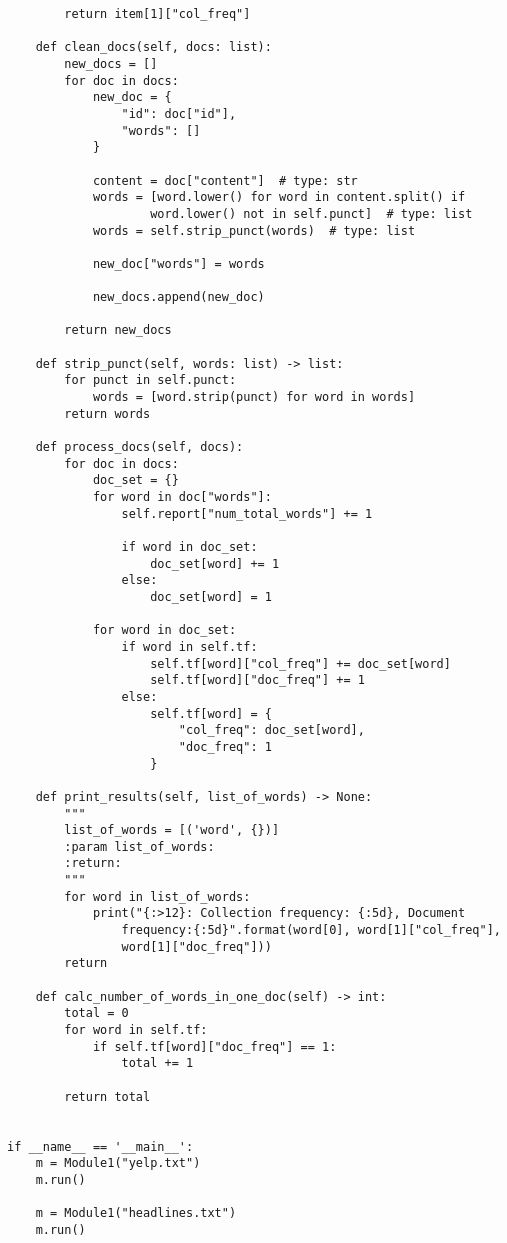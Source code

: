 \documentclass{article}
\begin{document}
\begin{verbatim}
        return item[1]["col_freq"]

    def clean_docs(self, docs: list):
        new_docs = []
        for doc in docs:
            new_doc = {
                "id": doc["id"],
                "words": []
            }

            content = doc["content"]  # type: str
            words = [word.lower() for word in content.split() if
                    word.lower() not in self.punct]  # type: list
            words = self.strip_punct(words)  # type: list

            new_doc["words"] = words

            new_docs.append(new_doc)

        return new_docs

    def strip_punct(self, words: list) -> list:
        for punct in self.punct:
            words = [word.strip(punct) for word in words]
        return words

    def process_docs(self, docs):
        for doc in docs:
            doc_set = {}
            for word in doc["words"]:
                self.report["num_total_words"] += 1

                if word in doc_set:
                    doc_set[word] += 1
                else:
                    doc_set[word] = 1

            for word in doc_set:
                if word in self.tf:
                    self.tf[word]["col_freq"] += doc_set[word]
                    self.tf[word]["doc_freq"] += 1
                else:
                    self.tf[word] = {
                        "col_freq": doc_set[word],
                        "doc_freq": 1
                    }

    def print_results(self, list_of_words) -> None:
        """
        list_of_words = [('word', {})]
        :param list_of_words:
        :return:
        """
        for word in list_of_words:
            print("{:>12}: Collection frequency: {:5d}, Document
                frequency:{:5d}".format(word[0], word[1]["col_freq"], 
                word[1]["doc_freq"]))
        return

    def calc_number_of_words_in_one_doc(self) -> int:
        total = 0
        for word in self.tf:
            if self.tf[word]["doc_freq"] == 1:
                total += 1

        return total


if __name__ == '__main__':
    m = Module1("yelp.txt")
    m.run()

    m = Module1("headlines.txt")
    m.run()
\end{verbatim}
\end{document}
